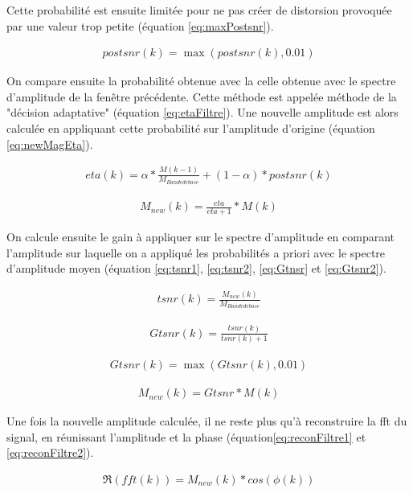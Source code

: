\documentclass[letterpaper, twoside, 12pt, memoire, creativecommons, hyperref]{thETS}
\begin{document}
Cette probabilité est ensuite limitée pour ne pas créer de distorsion provoquée par une valeur trop petite (équation \ref{eq:maxPostsnr}).

\begin{align}\label{eq:maxPostsnr}
   postsnr(k) = \max(postsnr(k), 0.01)
\end{align}

On compare ensuite la probabilité obtenue avec la celle obtenue avec le spectre d'amplitude de la fenêtre précédente. Cette méthode est appelée méthode de la "décision adaptative" (équation \ref{eq:etaFiltre}). Une nouvelle amplitude est alors calculée en appliquant cette probabilité sur l'amplitude d'origine (équation \ref{eq:newMagEta}).

\begin{align}\label{eq:etaFiltre}
   eta(k) = \alpha * \frac{M(k-1)}{M_{Bande de base}} + (1 - \alpha) * postsnr(k)
\end{align}

\begin{align}\label{eq:newMagEta}
   M_{new}(k) = \frac{eta}{eta+1} * M(k)
\end{align}

On calcule ensuite le gain à appliquer sur le spectre d'amplitude en comparant l'amplitude sur laquelle on a appliqué les probabilités a priori avec le spectre d'amplitude moyen (équation \ref{eq:tsnr1}, \ref{eq:tsnr2}, \ref{eq:Gtnsr} et \ref{eq:Gtsnr2}).

 \begin{align}\label{eq:tsnr1}
   tsnr(k) = \frac{M_{new}(k)}{M_{Bande de base}}
\end{align}

 \begin{align}\label{eq:tsnr2}
   Gtsnr(k) = \frac{tsnr(k)}{tsnr(k)+1}
\end{align}

 \begin{align}\label{eq:Gtnsr}
   Gtsnr(k) = \max(Gtsnr(k), 0.01)
\end{align}

\begin{align}\label{eq:Gtsnr2}
   M_{new}(k) = Gtsnr * M(k)
\end{align}

Une fois la nouvelle amplitude calculée, il ne reste plus qu'à reconstruire la fft du signal, en réunissant l'amplitude et la phase (équation\ref{eq:reconFiltre1} et \ref{eq:reconFiltre2}).

\begin{align}\label{eq:reconFiltre1}
   \Re(fft(k)) = M_{new}(k) * cos(\phi(k))
\end{align}
\end{document}
